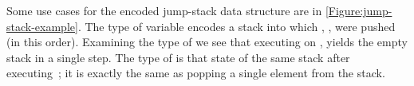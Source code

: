 
Some use cases for the encoded jump-stack data structure are in \cref{Figure:jump-stack-example}.
The type of variable  encodes a stack into which , ,  were pushed
  (in this order).
Examining the type of  we see that executing  on
  , yields the empty stack in a single step.
The type of  is that state of the same stack
  after executing~;
  it is exactly the same as popping a single element from the stack.

